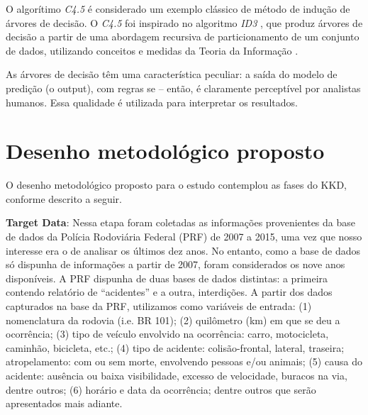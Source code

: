 \documentclass[conference,compsoc]{IEEEtran}
\begin{document}
O algorítimo \textit{C4.5} é considerado um exemplo clássico de método de indução de árvores de decisão. O \textit{C4.5} \cite{Learning2007} foi inspirado no algoritmo 
\textit{ID3} \cite{Learning1979}, que produz árvores de decisão a partir de uma abordagem recursiva de particionamento de um conjunto de dados, utilizando conceitos e medidas 
da Teoria da Informação \cite{TeoriaInf}.

As árvores de decisão têm uma característica peculiar: a saída do modelo de predição (o output), com regras se -- então, é claramente perceptível por analistas humanos.
Essa qualidade é utilizada para interpretar os resultados.


\section{Desenho metodológico proposto}

O desenho metodológico proposto para o estudo contemplou as fases do KKD, conforme descrito a seguir.

\textbf{Target Data}: Nessa etapa foram coletadas as informações provenientes da base de dados da Polícia Rodoviária Federal (PRF) de 2007 a 2015, 
uma vez que nosso interesse era o de analisar os últimos dez anos. No entanto, como a base de dados só dispunha de informações a partir 
de 2007, foram considerados os nove anos disponíveis. A PRF dispunha de duas bases de dados distintas: a primeira contendo relatório de 
``acidentes'' e a outra, interdições. A partir dos dados capturados na base da PRF, utilizamos como variáveis de entrada: 
(1) nomenclatura da rodovia (i.e. BR 101); 
(2) quilômetro (km) em que se deu a ocorrência; 
(3) tipo de veículo envolvido na ocorrência: carro, motocicleta, caminhão, bicicleta, etc.; 
(4) tipo de acidente: colisão-frontal, lateral, traseira; atropelamento: com ou sem morte, envolvendo pessoas e/ou animais; 
(5) causa do acidente: ausência ou baixa visibilidade, excesso de velocidade, buracos na via, dentre outros; 
(6) horário e data da ocorrência; dentre outros que serão apresentados mais adiante. 
\end{document}
